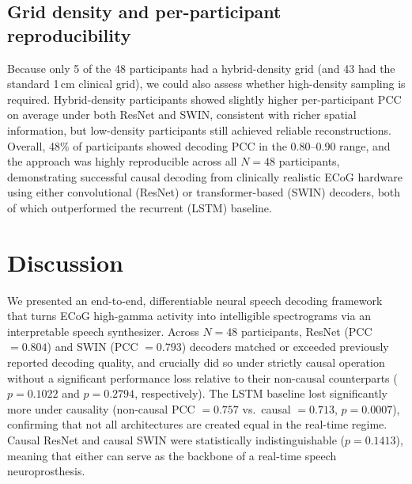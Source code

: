 \documentclass[11pt]{article}
\begin{document}
\subsection{Grid density and per-participant reproducibility}
Because only 5 of the 48 participants had a hybrid-density grid (and 43 had the standard 1\,cm clinical grid), we could also assess whether high-density sampling is required. Hybrid-density participants showed slightly higher per-participant PCC on average under both ResNet and SWIN, consistent with richer spatial information, but low-density participants still achieved reliable reconstructions. Overall, 48\% of participants showed decoding PCC in the 0.80--0.90 range, and the approach was highly reproducible across all $N=48$ participants, demonstrating successful causal decoding from clinically realistic ECoG hardware using either convolutional (ResNet) or transformer-based (SWIN) decoders, both of which outperformed the recurrent (LSTM) baseline.

\section{Discussion}

We presented an end-to-end, differentiable neural speech decoding framework that turns ECoG high-gamma activity into intelligible spectrograms via an interpretable speech synthesizer. Across $N=48$ participants, ResNet (PCC $= 0.804$) and SWIN (PCC $= 0.793$) decoders matched or exceeded previously reported decoding quality, and crucially did so under strictly causal operation without a significant performance loss relative to their non-causal counterparts ($p = 0.1022$ and $p = 0.2794$, respectively). The LSTM baseline lost significantly more under causality (non-causal PCC $= 0.757$ vs.\ causal $= 0.713$, $p = 0.0007$), confirming that not all architectures are created equal in the real-time regime. Causal ResNet and causal SWIN were statistically indistinguishable ($p = 0.1413$), meaning that either can serve as the backbone of a real-time speech neuroprosthesis.
\end{document}
